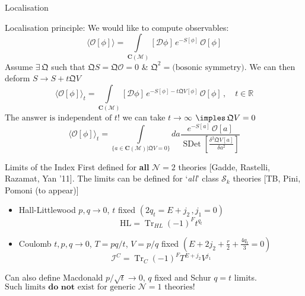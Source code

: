 \documentclass{beamer}
\DeclareMathOperator{\Tr}{Tr}
\DeclareMathOperator{\SDet}{SDet}
\begin{document}
\begin{frame}{Localisation}
\begin{block}{Localisation principle:}
We would like to compute observables:
\begin{equation}
\langle\mathcal{O}[\phi]\rangle=\int\limits_{\mathbf{C}(\mathcal{M})}[\mathcal{D}\phi]\,e^{-S[\phi]}\,\mathcal{O}[\phi]
\end{equation}
Assume $\exists\,\mathfrak{Q}$ such that $\mathfrak{Q}S=\mathfrak{Q}\mathcal{O}=0$ \& $\mathfrak{Q}^2=\text{(bosonic symmetry)}$. We can then deform $S\to S+t\mathfrak{Q}V$
\begin{equation}
    \langle\mathcal{O}[\phi]\rangle_t=\int\limits_{\mathbf{C}(\mathcal{M})}[\mathcal{D}\phi]\,e^{-S[\phi]-t\mathfrak{Q}V[\phi]}\,\mathcal{O}[\phi]\,,\quad t\in\mathbb{R}
\end{equation}
$\boxed{\text{The answer is independent of $t$!}}$ we can take $t\to\infty$ $\imples\,\mathfrak{Q}V=0$
\begin{equation}
   \langle\mathcal{O}[\phi]\rangle_t=\int\limits_{\{a\in\mathbf{C}(\mathcal{M})|\mathfrak{Q}V=0\}} da\frac{e^{-S[a]}\,\mathcal{O}[a]}{\SDet\left[\frac{\delta^2 \mathfrak{Q}V[a]}{\delta a^2}\right]} 
\end{equation}
\end{block}
\end{frame}
\begin{frame}{Limits of the Index}
First defined for \textbf{all} $\mathcal{N}=2$ theories \color{blue}[Gadde, Rastelli, Razamat, Yan '11]\color{black}. The limits can be defined for `\textit{all}' class $\mathcal{S}_k$ theories \color{blue}[TB, Pini, Pomoni (to appear)]\color{black}\newline
\begin{itemize}
    \item{ Hall-Littlewood $p,q\to0$, $t$ fixed $(2q_t=E+j_2\,,j_1=0)$\begin{equation*}
        \mathrm{HL}=\Tr_{HL}(-1)^Ft^{q_t}
    \end{equation*}}
    \item{ Coulomb $t,p,q\to0$, $T=pq/t$, $V=p/q$ fixed $(E+2j_2+\frac{r}{2}+\frac{4q_t}{3}=0)$ \begin{equation*}
        \mathcal{I}^C=\Tr_{C} (-1)^FT^{E+j_2}V^{j_1}
    \end{equation*}}            
\end{itemize}
Can also define Macdonald $p/\sqrt{t}\to0$, $q$ fixed and Schur $q=t$ limits.\newline
$\boxed{\text{Such limits }\textbf{do not }\text{exist for generic $\mathcal{N}=1$ theories!} }$
\end{frame}
\end{document}
